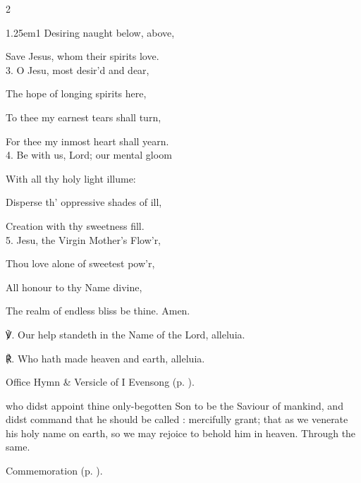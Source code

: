 \begin{paracol}{2}
\begin{hangparas}{1.25em}{1}
Desiring naught below, above,

Save Jesus, whom their spirits love.\\

3. O Jesu, most desir'd and dear,

The hope of longing spirits here,

To thee my earnest tears shall turn,

For thee my inmost heart shall yearn.\\

4. Be with us, Lord; our mental gloom

With all thy holy light illume:

Disperse th' oppressive shades of ill,

Creation with thy sweetness fill.\\

5. Jesu, the Virgin Mother's Flow'r,

Thou love alone of sweetest pow'r,

All honour to thy Name divine,

The realm of endless bliss be thine. Amen.\\
\end{hangparas}

℣. Our help standeth in the Name of the Lord, alleluia.

℟. Who hath made heaven and earth, alleluia.

\end{paracol}

\clearpage
\secondEvensong


\begin{rubric}
	Office Hymn \& Versicle of I Evensong (p. \pageref{HolyNameEvensongHymn}).
\end{rubric}


\collect
{} who didst appoint thine only-begotten Son to be the Saviour of mankind, and didst command that he should be called : mercifully grant; that as we venerate his holy name on earth, so we may rejoice to behold him in heaven. Through the same.
\begin{rubric}
	Commemoration  (p. \pageref{StephenCollect}).
\end{rubric}


